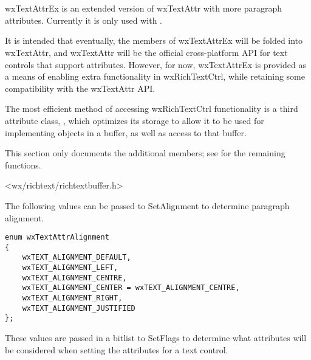 \section{}\label{wxtextattrex}

wxTextAttrEx is an extended version of wxTextAttr with more paragraph attributes.
Currently it is only used with .

It is intended that eventually, the members of wxTextAttrEx will
be folded into wxTextAttr, and wxTextAttr will be the official
cross-platform API for text controls that support attributes.
However, for now, wxTextAttrEx is provided as a means of enabling
extra functionality in wxRichTextCtrl, while retaining some compatibility
with the wxTextAttr API.

The most efficient method of accessing wxRichTextCtrl functionality
is a third attribute class, , which
optimizes its storage to allow it to be used for implementing objects
in a buffer, as well as access to that buffer.

This section only documents the additional members; see  for
the remaining functions.




<wx/richtext/richtextbuffer.h>


The following values can be passed to SetAlignment to determine
paragraph alignment.

{\small
\begin{verbatim}
enum wxTextAttrAlignment
{
    wxTEXT_ALIGNMENT_DEFAULT,
    wxTEXT_ALIGNMENT_LEFT,
    wxTEXT_ALIGNMENT_CENTRE,
    wxTEXT_ALIGNMENT_CENTER = wxTEXT_ALIGNMENT_CENTRE,
    wxTEXT_ALIGNMENT_RIGHT,
    wxTEXT_ALIGNMENT_JUSTIFIED
};
\end{verbatim}
}

These values are passed in a bitlist to SetFlags to determine
what attributes will be considered when setting the attributes
for a text control.

